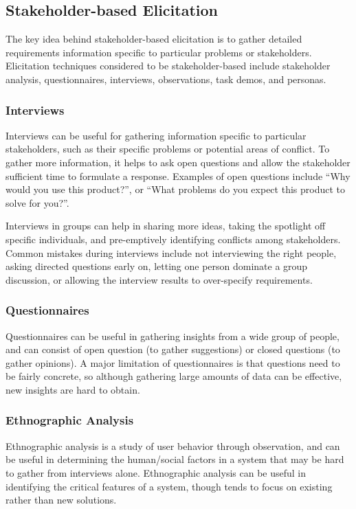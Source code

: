 \documentclass[12pt,titlepage]{article}
\begin{document}
    \subsection{Stakeholder-based Elicitation}
      The key idea behind stakeholder-based elicitation is to gather detailed requirements information specific to particular problems or stakeholders.
      Elicitation techniques considered to be stakeholder-based include stakeholder analysis, questionnaires, interviews, observations, task demos, and personas.

      \subsubsection{Interviews}
        Interviews can be useful for gathering information specific to particular stakeholders, such as their specific problems or potential areas of conflict.
        To gather more information, it helps to ask open questions and allow the stakeholder sufficient time to formulate a response. Examples of open questions
        include ``Why would you use this product?'', or ``What problems do you expect this product to solve for you?''.

        Interviews in groups can help in sharing more ideas, taking the spotlight off specific individuals, and pre-emptively identifying conflicts among stakeholders.
        Common mistakes during interviews include not interviewing the right people, asking directed questions early on, letting one person dominate a group discussion,
        or allowing the interview results to over-specify requirements.

      \subsubsection{Questionnaires}
        Questionnaires can be useful in gathering insights from a wide group of people, and can consist of open question (to gather suggestions) or closed questions
        (to gather opinions). A major limitation of questionnaires is that questions need to be fairly concrete, so although gathering large amounts of data can be
        effective, new insights are hard to obtain.

      \subsubsection{Ethnographic Analysis}
        Ethnographic analysis is a study of user behavior through observation, and can be useful in determining the human/social factors in a system that
        may be hard to gather from interviews alone. Ethnographic analysis can be useful in identifying the critical features of a system, though tends to focus on
        existing rather than new solutions.
\end{document}
